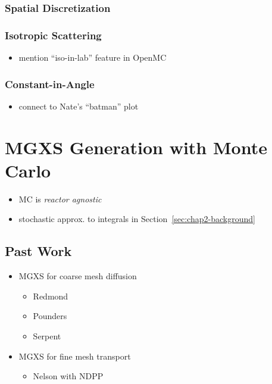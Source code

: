 \subsubsection{Spatial Discretization}
\label{subsubsec:chap2-space-discrete}

\subsubsection{Isotropic Scattering}
\label{subsubsec:chap2-iso-scatter}

\begin{itemize}
  \item mention ``iso-in-lab'' feature in OpenMC
\end{itemize}

\subsubsection{Constant-in-Angle}
\label{subsubsec:chap2-const-in-angle}

\begin{itemize}
  \item connect to Nate's ``batman'' plot
\end{itemize}


\section{MGXS Generation with Monte Carlo}
\label{sec:chap2-mgxs-mc}

\begin{itemize}
  \item \ac{MC} is \emph{reactor agnostic}
  \item stochastic approx. to integrals in Section~\ref{sec:chap2-background}
\end{itemize}

\subsection{Past Work}
\label{subsec:chap2-past-work}

\begin{itemize}
  \item \ac{MGXS} for coarse mesh diffusion
  \begin{itemize}
    \item Redmond
    \item Pounders
    \item Serpent
  \end{itemize}
  \item \ac{MGXS} for fine mesh transport
  \begin{itemize}
    \item Nelson with NDPP
  \end{itemize}
\end{itemize}

